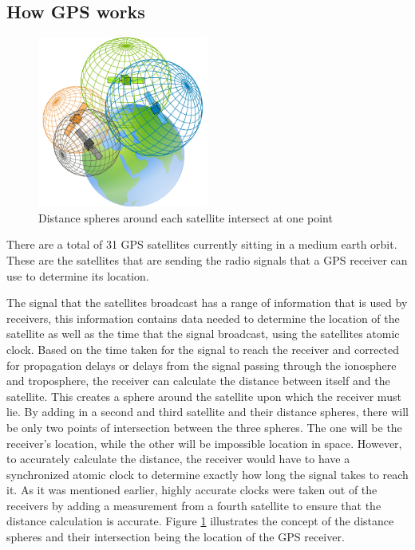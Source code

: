 \subsection{How GPS works}
\begin{figure}
	\begin{center}
		\includegraphics[width = 0.5\textwidth]{figures/GPStriangle.png}
		\caption{Distance spheres around each satellite intersect at one point}
		\label{fig:2:tiangleGPS}
	\end{center}
\end{figure}
There are a total of 31 GPS satellites currently sitting in a medium earth orbit. These are the satellites that are sending the radio signals that a GPS receiver can use to determine its location.\par
\vspace{0.6cm}
The signal that the satellites broadcast has a range of information that is used by receivers, this information contains data needed to determine the location of the satellite as well as the time that the signal broadcast, using the satellites atomic clock. Based on the time taken for the signal to reach the receiver and corrected for propagation delays or delays from the signal passing through the ionosphere and troposphere, the receiver can calculate the distance between itself and the satellite. This creates a sphere around the satellite upon which the receiver must lie. By adding in a second and third satellite and their distance spheres, there will be only two points of intersection between the three spheres. The one will be the receiver's location, while the other will be impossible location in space. However, to accurately calculate the distance, the receiver would have to have a synchronized atomic clock to determine exactly how long the signal takes to reach it. As it was mentioned earlier, highly accurate clocks were taken out of the receivers by adding a measurement from a fourth satellite to ensure that the distance calculation is accurate. Figure \ref{fig:2:tiangleGPS} illustrates the concept of the distance spheres and their intersection being the location of the GPS receiver. \cite{FederalAviationAdministration}
